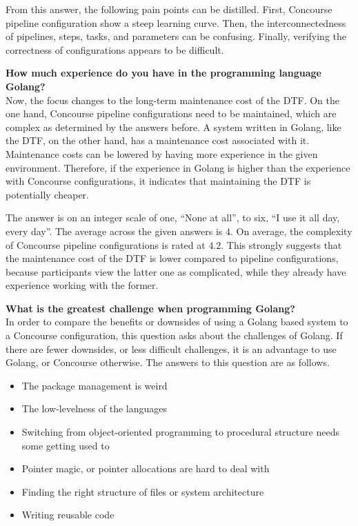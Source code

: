 From this answer, the following pain points can be distilled.
First, Concourse pipeline configuration show a steep learning curve.
Then, the interconnectedness of pipelines, steps, tasks, and parameters can be confusing.
Finally, verifying the correctness of configurations appears to be difficult.

\pagebreak

\textbf{How much experience do you have in the programming language Golang?}\\
Now, the focus changes to the long-term maintenance cost of the DTF.
On the one hand, Concourse pipeline configurations need to be maintained, which are complex as determined by the answers before.
A system written in Golang, like the DTF, on the other hand, has a maintenance cost associated with it.
Maintenance costs can be lowered by having more experience in the given environment.
Therefore, if the experience in Golang is higher than the experience with Concourse configurations, it indicates that maintaining the DTF is potentially cheaper.

The answer is on an integer scale of one, ``None at all'', to six, ``I use it all day, every day''.
The average across the given answers is $4$.
On average, the complexity of Concourse pipeline configurations is rated at $4.2$.
This strongly suggests that the maintenance cost of the DTF is lower compared to pipeline configurations, because participants view the latter one as complicated, while they already have experience working with the former.

\textbf{What is the greatest challenge when programming Golang?}\\
In order to compare the benefits or downsides of using a Golang based system to a Concourse configuration, this question asks about the challenges of Golang.
If there are fewer downsides, or less difficult challenges, it is an advantage to use Golang, or Concourse otherwise.
The answers to this question are as follows.

\begin{itemize}
    \item The package management is weird
    \item The low-levelness of the languages
    \item Switching from object-oriented programming to procedural structure needs some getting used to
    \item Pointer magic, or pointer allocations are hard to deal with
    \item Finding the right structure of files or system architecture
    \item Writing reusable code
\end{itemize}

